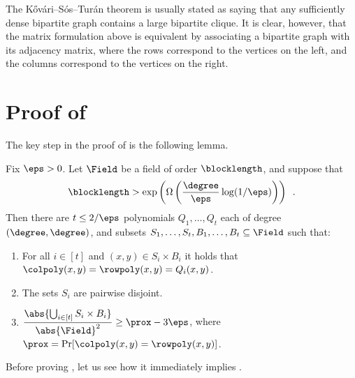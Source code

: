 \documentclass{toc}
\theoremstyle{plain}
\begin{document}
\begin{remark}
  The %
K\H{o}v\'{a}ri--S\'{o}s--Tur\'{a}n   %
  theorem is usually stated as saying that
    any sufficiently dense bipartite graph contains a large bipartite clique.
    It is clear, however, that the matrix formulation above is equivalent
    by associating a bipartite graph with its adjacency matrix, where the rows correspond to the vertices
    on the left, and the columns correspond to the vertices on the right.
\end{remark}
%
%




%
%
%
\section{Proof of }
\label{sec:proof2}

The key step in the proof of  is the following lemma.

\begin{lemma}\label{lemma:key}
  Fix $\eps > 0$. Let $\Field$ be a field of
%
  order %
  $\blocklength$, and suppose that
  \[
    \blocklength > \exp\left(\Omega\left(\frac{\degree}{\eps}
    \log({1}/{\eps})\right)\right)\enspace.
  \]
  Then there are $t \leq {2}/{\eps}$ polynomials $Q_1,\dots,Q_t$
  each of degree $(\degree,\degree)$, and subsets
  $S_1,\dots,S_t,B_1,\dots,B_t \subseteq \Field$ such that:
    \begin{enumerate}
        \item
            For all $i \in [t]$ and $(x,y) \in S_i \times B_i$ it holds that $\colpoly(x,y) = \rowpoly(x,y) = Q_i(x,y)$.
        \item
%
%
          The sets $S_i$ are pairwise disjoint.                 %
%
%
        \item
%
  $\displaystyle{\frac{\abs{\bigcup_{i \in [t]} S_i \times B_i}}{\abs{\Field}^2} \geq \prox - 3\eps}$,          %
            where $\prox = \Pr[\colpoly(x,y) = \rowpoly(x,y)]$.
    \end{enumerate}
\end{lemma}

Before proving , let us see how it immediately implies .
\end{document}
